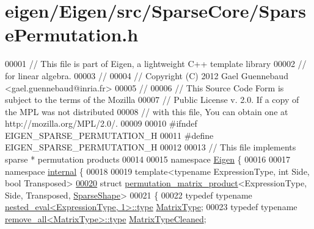 \hypertarget{eigen_2_eigen_2src_2_sparse_core_2_sparse_permutation_8h_source}{}\section{eigen/\+Eigen/src/\+Sparse\+Core/\+Sparse\+Permutation.h}
\label{eigen_2_eigen_2src_2_sparse_core_2_sparse_permutation_8h_source}

\begin{DoxyCode}
00001 \textcolor{comment}{// This file is part of Eigen, a lightweight C++ template library}
00002 \textcolor{comment}{// for linear algebra.}
00003 \textcolor{comment}{//}
00004 \textcolor{comment}{// Copyright (C) 2012 Gael Guennebaud <gael.guennebaud@inria.fr>}
00005 \textcolor{comment}{//}
00006 \textcolor{comment}{// This Source Code Form is subject to the terms of the Mozilla}
00007 \textcolor{comment}{// Public License v. 2.0. If a copy of the MPL was not distributed}
00008 \textcolor{comment}{// with this file, You can obtain one at http://mozilla.org/MPL/2.0/.}
00009 
00010 \textcolor{preprocessor}{#ifndef EIGEN\_SPARSE\_PERMUTATION\_H}
00011 \textcolor{preprocessor}{#define EIGEN\_SPARSE\_PERMUTATION\_H}
00012 
00013 \textcolor{comment}{// This file implements sparse * permutation products}
00014 
00015 \textcolor{keyword}{namespace }\hyperlink{namespace_eigen}{Eigen} \{ 
00016 
00017 \textcolor{keyword}{namespace }\hyperlink{namespaceinternal}{internal} \{
00018 
00019 \textcolor{keyword}{template}<\textcolor{keyword}{typename} ExpressionType, \textcolor{keywordtype}{int} S\textcolor{keywordtype}{id}e, \textcolor{keywordtype}{bool} Transposed>
\hyperlink{struct_eigen_1_1internal_1_1permutation__matrix__product_3_01_expression_type_00_01_side_00_01_t20ccd76e9ac5a7579d51cf9e9a5cbb67}{00020} \textcolor{keyword}{struct }\hyperlink{struct_eigen_1_1internal_1_1permutation__matrix__product}{permutation\_matrix\_product}<ExpressionType, Side, Transposed, 
      \hyperlink{struct_eigen_1_1_sparse_shape}{SparseShape}>
00021 \{
00022     \textcolor{keyword}{typedef} \textcolor{keyword}{typename} \hyperlink{class_eigen_1_1internal_1_1_tensor_lazy_evaluator_writable}{nested\_eval<ExpressionType, 1>::type} 
      \hyperlink{class_eigen_1_1internal_1_1_tensor_lazy_evaluator_writable}{MatrixType};
00023     \textcolor{keyword}{typedef} \textcolor{keyword}{typename} \hyperlink{group___sparse_core___module}{remove\_all<MatrixType>::type} 
      \hyperlink{group___sparse_core___module}{MatrixTypeCleaned};

\end{DoxyCode}
